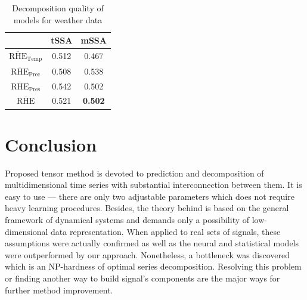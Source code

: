 \documentclass[referee, pdflatex]{sn-jnl}
\theoremstyle{definition}
\theoremstyle{plain}
\begin{document}
	\def\arraystretch{1.2}
	\begin{table}[h!]
		\centering
		\caption{Decomposition quality of models for weather data}\label{tab:decomp_weather_results}
		\begin{tabular}{|c|c|c|}
			\hline
			& tSSA  & mSSA           \\ \hline
			$ \overline{\text{RHE}}_{\text{Temp}} $   & 0.512 & 0.467          \\ \hline
			$ \overline{\text{RHE}}_{\text{Prec}} $ & 0.508 & 0.538          \\ \hline
			$ \overline{\text{RHE}}_{\text{Pres}} $   & 0.542 & 0.502          \\ \hline
			$ \overline{\text{RHE}} $         & 0.521 & \textbf{0.502} \\ \hline
		\end{tabular}
	\end{table}	
	
	\section{Conclusion}
	
		Proposed tensor method is devoted to prediction and decomposition of multidimensional time series with substantial interconnection between them. It is easy to use --- there are only two adjustable parameters which does not require heavy learning procedures. Besides, the theory behind is based on the general framework of dynamical systems and demands only a possibility of low-dimensional data representation. When applied to real sets of signals, these assumptions were actually confirmed as well as the neural and statistical models were outperformed by our approach. Nonetheless, a bottleneck was discovered which is an NP-hardness of optimal series decomposition. Resolving this problem or finding another way to build signal's components are the major ways for further method improvement.
		
		\printbibliography
	
 
\end{document}
